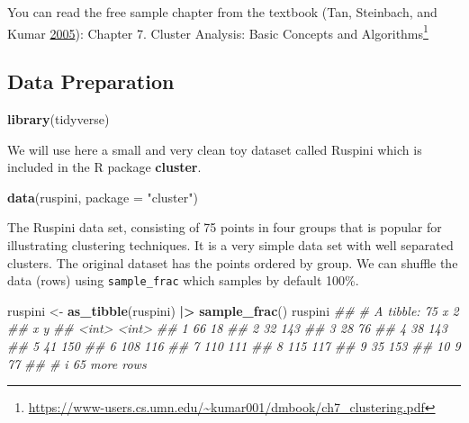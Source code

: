 \documentclass[
  notitlepage]{book}
\newenvironment{Shaded}{\begin{snugshade}}{\end{snugshade}}
\newcommand{\CommentTok}[1]{\textcolor[rgb]{0.56,0.35,0.01}{\textit{#1}}}
\newcommand{\DataTypeTok}[1]{\textcolor[rgb]{0.13,0.29,0.53}{#1}}
\newcommand{\ErrorTok}[1]{\textcolor[rgb]{0.64,0.00,0.00}{\textbf{#1}}}
\newcommand{\KeywordTok}[1]{\textcolor[rgb]{0.13,0.29,0.53}{\textbf{#1}}}
\newcommand{\NormalTok}[1]{#1}
\newcommand{\OperatorTok}[1]{\textcolor[rgb]{0.81,0.36,0.00}{\textbf{#1}}}
\newcommand{\StringTok}[1]{\textcolor[rgb]{0.31,0.60,0.02}{#1}}
\DeclareRobustCommand{\href}[2]{#2\footnote{\url{#1}}}
\begin{document}
You can read the free sample chapter from the textbook (Tan, Steinbach, and Kumar \protect\hyperlink{ref-Tan2005}{2005}):
\href{https://www-users.cs.umn.edu/~kumar001/dmbook/ch7_clustering.pdf}{Chapter 7. Cluster Analysis: Basic Concepts and
Algorithms}

\hypertarget{data-preparation}{%
\subsection{Data Preparation}\label{data-preparation}}

\begin{Shaded}
\begin{Highlighting}[]
\KeywordTok{library}\NormalTok{(tidyverse)}
\end{Highlighting}
\end{Shaded}

We will use here a small and very clean toy dataset called Ruspini which is
included in the R package \textbf{cluster}.

\begin{Shaded}
\begin{Highlighting}[]
\KeywordTok{data}\NormalTok{(ruspini, }\DataTypeTok{package =} \StringTok{"cluster"}\NormalTok{)}
\end{Highlighting}
\end{Shaded}

The Ruspini data set, consisting of 75 points in four groups that is
popular for illustrating clustering techniques. It is a very simple data
set with well separated clusters. The original dataset has the points
ordered by group. We can shuffle the data (rows) using \texttt{sample\_frac}
which samples by default 100\%.

\begin{Shaded}
\begin{Highlighting}[]
\NormalTok{ruspini \textless{}{-}}\StringTok{ }\KeywordTok{as\_tibble}\NormalTok{(ruspini) }\OperatorTok{|}\ErrorTok{\textgreater{}}\StringTok{ }
\StringTok{  }\KeywordTok{sample\_frac}\NormalTok{()}
\NormalTok{ruspini}
\CommentTok{\#\# \# A tibble: 75 x 2}
\CommentTok{\#\#        x     y}
\CommentTok{\#\#    \textless{}int\textgreater{} \textless{}int\textgreater{}}
\CommentTok{\#\#  1    66    18}
\CommentTok{\#\#  2    32   143}
\CommentTok{\#\#  3    28    76}
\CommentTok{\#\#  4    38   143}
\CommentTok{\#\#  5    41   150}
\CommentTok{\#\#  6   108   116}
\CommentTok{\#\#  7   110   111}
\CommentTok{\#\#  8   115   117}
\CommentTok{\#\#  9    35   153}
\CommentTok{\#\# 10     9    77}
\CommentTok{\#\# \# i 65 more rows}
\end{Highlighting}
\end{Shaded}
\end{document}

